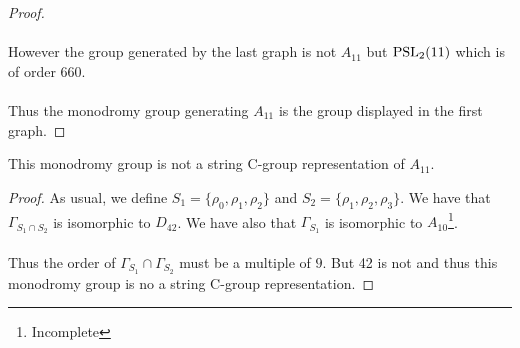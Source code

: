 \begin{proof}
\begin{figure}[H]
\begin{center}
      \caption{}
    \end{center}
  \end{figure}

  \paragraph{}
  However the group generated by the last graph is not $A_{11}$ but $\operatorname{PSL}_2(11)$ which is of order 660.

  \paragraph{}
  Thus the monodromy group generating $A_{11}$ is the group displayed in the first graph.

\end{proof}

\begin{theorem}
  This monodromy group is not a string C-group representation of $A_{11}$.
\end{theorem}

\begin{proof}
  As usual, we define $S_1 = \{\rho_0,\rho_1, \rho_2\}$ and $S_2 = \{\rho_1, \rho_2, \rho_3\}$. We have that $\Gamma_{S_1 \cap S_2}$ is isomorphic to $D_{42}$. We have also that $\Gamma_{S_1}$ is isomorphic to $A_{10}$\footnote{Incomplete}.

  \paragraph{}
  Thus the order of $\Gamma_{S_1} \cap \Gamma_{S_2}$ must be a multiple of $9$. But 42 is not and thus this monodromy group is no a string C-group representation.
\end{proof}
